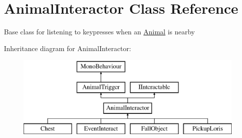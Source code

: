 \hypertarget{class_animal_interactor}{}\section{Animal\+Interactor Class Reference}
\label{class_animal_interactor}


Base class for listening to keypresses when an \mbox{\hyperlink{class_animal}{Animal}} is nearby  


Inheritance diagram for Animal\+Interactor\+:\begin{figure}[H]
\begin{center}
\leavevmode
\includegraphics[height=4.000000cm]{class_animal_interactor}
\end{center}
\end{figure}
